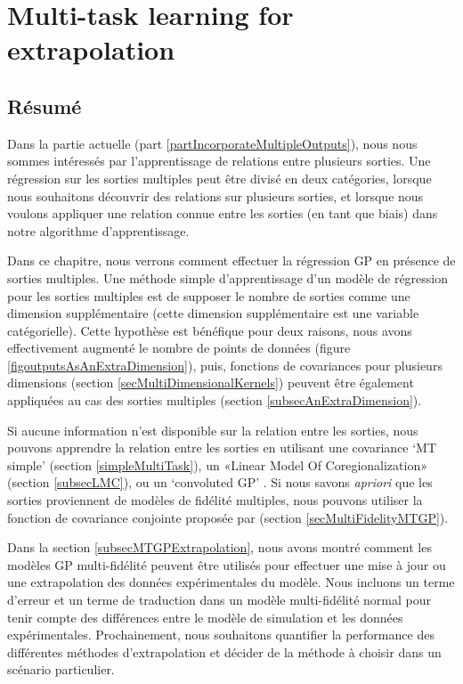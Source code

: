 \chapter{Multi-task learning for extrapolation}
\label{chapMultiTaskExtrapolation}

\begin{mdframed}[hidealllines=true,backgroundcolor=lightgray!20]
\section*{Résumé}
Dans la partie actuelle (part \ref{partIncorporateMultipleOutputs}), nous nous sommes intéressés par l'apprentissage de relations entre plusieurs sorties. Une régression sur les sorties multiples peut être divisé en deux catégories, lorsque nous souhaitons découvrir des relations sur plusieurs sorties, et lorsque nous voulons appliquer une relation connue entre les sorties (en tant que biais) dans notre algorithme d'apprentissage.

Dans ce chapitre, nous verrons comment effectuer la régression GP en présence de sorties multiples. Une méthode simple d'apprentissage d'un modèle de régression pour les sorties multiples est de supposer le nombre de sorties comme une dimension supplémentaire (cette dimension supplémentaire est une variable catégorielle). Cette hypothèse est bénéfique pour deux raisons, nous avons effectivement augmenté le nombre de points de données (figure \ref{figoutputsAsAnExtraDimension}), puis, fonctions de covariances pour plusieurs dimensions (section \ref{secMultiDimensionalKernels}) peuvent être également appliquées au cas des sorties multiples (section \ref{subsecAnExtraDimension}).

Si aucune information n'est disponible sur la relation entre les sorties, nous pouvons apprendre la relation entre les sorties en utilisant une covariance `MT simple’ (section \ref{simpleMultiTask}), un «Linear Model Of Coregionalization» (section \ref{subsecLMC}), ou un `convoluted GP’ \cite{alvarez2011kernels}. Si nous savons \textit{apriori} que les sorties proviennent de modèles de fidélité multiples, nous pouvons utiliser la fonction de covariance conjointe proposée par \cite{kennedy2000predicting} (section \ref{secMultiFidelityMTGP}).

Dans la section \ref{subsecMTGPExtrapolation}, nous avons montré comment les modèles GP multi-fidélité peuvent être utilisés pour effectuer une mise à jour ou une extrapolation des données expérimentales du modèle. Nous incluons un terme d'erreur et un terme de traduction dans un modèle multi-fidélité normal pour tenir compte des différences entre le modèle de simulation et les données expérimentales. Prochainement, nous souhaitons quantifier la performance des différentes méthodes d'extrapolation et décider de la méthode à choisir dans un scénario particulier.
\end{mdframed}


